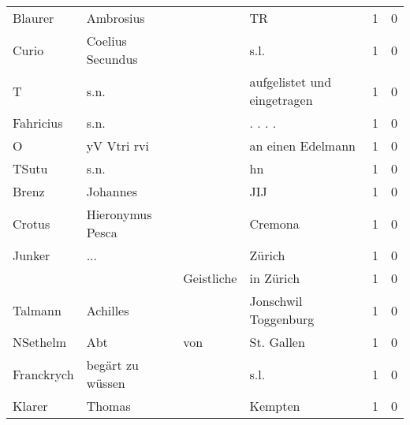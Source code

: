 \begin{center}
\begin{tiny}
\begin{longtabu}{llllrr}
                  Blaurer &                          Ambrosius &             &                                          TR &          1 &         0 \\
                    Curio &                   Coelius Secundus &             &                                        s.l. &          1 &         0 \\
                        T &                               s.n. &             &                 aufgelistet und eingetragen &          1 &         0 \\
                Fahricius &                               s.n. &             &                                    . . . .  &          1 &         0 \\
                        O &                        yV Vtri rvi &             &                           an einen Edelmann &          1 &         0 \\
                    TSutu &                               s.n. &             &                                          hn &          1 &         0 \\
                    Brenz &                           Johannes &             &                                         JIJ &          1 &         0 \\
                   Crotus &                   Hieronymus Pesca &             &                                     Cremona &          1 &         0 \\
                   Junker &                                ... &             &                                      Zürich &          1 &         0 \\
                          &                                    &  Geistliche &                                   in Zürich &          1 &         0 \\
                  Talmann &                           Achilles &             &                        Jonschwil Toggenburg &          1 &         0 \\
                 NSethelm &                                Abt &         von &                                  St. Gallen &          1 &         0 \\
               Franckrych &                   begärt zu wüssen &             &                                        s.l. &          1 &         0 \\
                   Klarer &                             Thomas &             &                                     Kempten &          1 &         0 \\

\end{longtabu}
\end{tiny}
\end{center}
